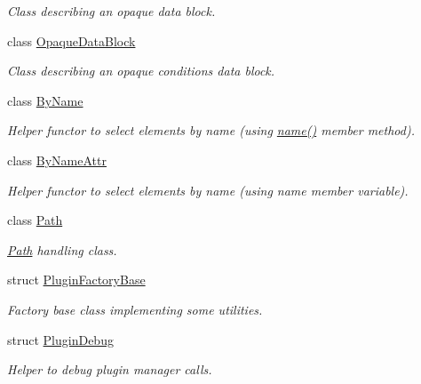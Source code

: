 \begin{DoxyCompactItemize}
\begin{DoxyCompactList}\small\item\em Class describing an opaque data block. \item\end{DoxyCompactList}\item 
class \hyperlink{class_d_d4hep_1_1_opaque_data_block}{OpaqueDataBlock}
\begin{DoxyCompactList}\small\item\em Class describing an opaque conditions data block. \item\end{DoxyCompactList}\item 
class \hyperlink{class_d_d4hep_1_1_by_name}{ByName}
\begin{DoxyCompactList}\small\item\em Helper functor to select elements by name (using \hyperlink{class_d_d4hep_1_1_by_name_a06f4c668c9195f670ee1ace07191efa1}{name()} member method). \item\end{DoxyCompactList}\item 
class \hyperlink{class_d_d4hep_1_1_by_name_attr}{ByNameAttr}
\begin{DoxyCompactList}\small\item\em Helper functor to select elements by name (using name member variable). \item\end{DoxyCompactList}\item 
class \hyperlink{class_d_d4hep_1_1_path}{Path}
\begin{DoxyCompactList}\small\item\em \hyperlink{class_d_d4hep_1_1_path}{Path} handling class. \item\end{DoxyCompactList}\item 
struct \hyperlink{struct_d_d4hep_1_1_plugin_factory_base}{PluginFactoryBase}
\begin{DoxyCompactList}\small\item\em Factory base class implementing some utilities. \item\end{DoxyCompactList}\item 
struct \hyperlink{struct_d_d4hep_1_1_plugin_debug}{PluginDebug}
\begin{DoxyCompactList}\small\item\em Helper to debug plugin manager calls. \item\end{DoxyCompactList}\item 

\end{DoxyCompactItemize}

